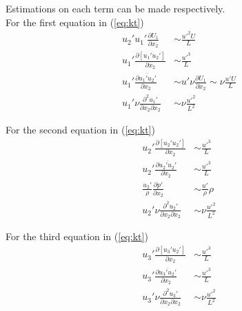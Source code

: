 \documentclass[paper=a4, fontsize=11pt]{scrartcl} %
\numberwithin{equation}{section} %
\numberwithin{figure}{section} %
\numberwithin{table}{section} %
\begin{document}
	Estimations on each term can be made respectively.\\
	For the first equation in (\ref{eq:kt})
	\begin{equation}
		\begin{aligned}
			u_2' u_1'\frac{\partial U_1}{\partial x_2} & \sim \frac{u'^2 U}{L}\\
			u_1'\frac{\partial [u_1'u_2']}{\partial x_2} & \sim \frac{u'^3}{L}\\
			u_1'\frac{\partial \overline{u_1' u_2'}}{\partial x_2} & \sim u'\nu \frac{\partial U_1}{\partial x_2} \sim \nu \frac{u' U}{L}\\
			u_1'\nu \frac{\partial^2 u_1'}{\partial x_2 \partial x_2} & \sim \nu \frac{u'^2}{L^2}
		\end{aligned}
	\end{equation}
	
	For the second equation in (\ref{eq:kt})
	\begin{equation}
		\begin{aligned}
			u_2'\frac{\partial [u_2'u_2']}{\partial x_2} & \sim \frac{u'^3}{L}\\
			u_2'\frac{\partial \overline{u_2' u_2'}}{\partial x_2} & \sim \frac{u'^3}{L}\\
			\frac{u_2'}{\rho}\frac{\partial p'}{\partial x_2} & \sim \frac{u'}{\rho} \rho \\
			u_2'\nu \frac{\partial^2 u_2'}{\partial x_2 \partial x_2} & \sim \nu \frac{u'^2}{L^2}
		\end{aligned}
	\end{equation}
	
	For the third equation in (\ref{eq:kt})
	\begin{equation}
		\begin{aligned}
			u_3'\frac{\partial [u_3'u_2']}{\partial x_2} & \sim \frac{u'^3}{L}\\
			u_3'\frac{\partial \overline{u_3' u_2'}}{\partial x_2} & \sim \frac{u'^3}{L}\\
			u_3'\nu \frac{\partial^2 u_3'}{\partial x_2 \partial x_2} & \sim \nu \frac{u'^2}{L^2}
		\end{aligned}
	\end{equation}
	
\end{document}
